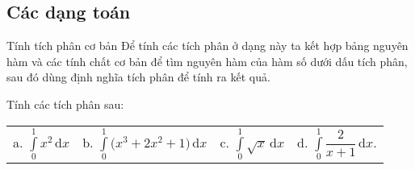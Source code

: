 	\subsection{Các dạng toán}
	\begin{dang}{Tính tích phân cơ bản}
		Để tính các tích phân ở dạng này ta kết hợp bảng nguyên hàm và các tính chất cơ bản để tìm nguyên hàm của hàm số dưới dấu tích phân, sau đó dùng định nghĩa tích phân để tính ra kết quả.
	\end{dang}
\setcounter{vd}{0}
	\begin{vd}%
		Tính các tích phân sau:
		
		\begin{tabular}{@{}p{}@{}p{}@{}p{}@{}p{}@{}}
			a. $\displaystyle\int\limits_0^1 x^2 \,\textrm{d}x$ & b. $\displaystyle\int\limits_0^1 \bigl(x^3+2x^2+1\bigr) \,\textrm{d}x$ & c. $\displaystyle\int\limits_0^1 \sqrt{x} \,\textrm{d}x$ & d. $\displaystyle\int\limits_0^1 \dfrac{2}{x+1} \,\textrm{d}x$.
		\end{tabular}
	\end{vd}
	
